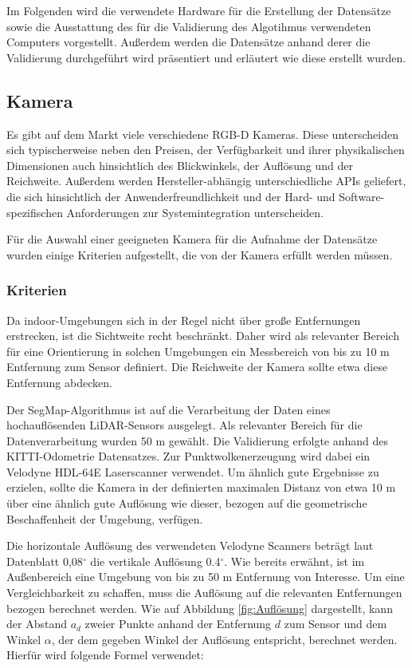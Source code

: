 Im Folgenden wird die verwendete Hardware für die Erstellung der Datensätze sowie die Ausstattung des für die Validierung des Algotihmus verwendeten Computers vorgestellt. Außerdem werden die Datensätze anhand derer die Validierung durchgeführt wird präsentiert und erläutert wie diese erstellt wurden.

\subsection[Kamera (Kopp)]{Kamera}
\label{sec:kamera}

Es gibt auf dem Markt viele verschiedene RGB-D Kameras. Diese unterscheiden sich typischerweise neben den Preisen, der Verfügbarkeit und ihrer physikalischen Dimensionen auch hinsichtlich des Blickwinkels, der Auflösung und der Reichweite. Außerdem werden Hersteller-abhängig unterschiedliche APIs geliefert, die sich hinsichtlich der Anwenderfreundlichkeit und der Hard- und Software-spezifischen Anforderungen zur Systemintegration unterscheiden. 

Für die Auswahl einer geeigneten Kamera für die Aufnahme der Datensätze wurden einige Kriterien aufgestellt, die von der Kamera erfüllt werden müssen. 

\subsubsection{Kriterien}

Da indoor-Umgebungen sich in der Regel nicht über große Entfernungen erstrecken, ist die Sichtweite recht beschränkt. Daher wird als relevanter Bereich für eine Orientierung in solchen Umgebungen ein Messbereich von bis zu 10 m Entfernung zum Sensor definiert. Die Reichweite der Kamera sollte etwa diese Entfernung abdecken. 

Der SegMap-Algorithmus ist auf die Verarbeitung der Daten eines hochauflösenden LiDAR-Sensors ausgelegt. Als relevanter Bereich für die Datenverarbeitung wurden 50 m gewählt. Die Validierung erfolgte anhand des KITTI-Odometrie Datensatzes. Zur Punktwolkenerzeugung wird dabei ein Velodyne HDL-64E Laserscanner verwendet. Um ähnlich gute Ergebnisse  zu erzielen, sollte die Kamera in der definierten maximalen Distanz von etwa 10 m über eine ähnlich gute Auflösung wie dieser, bezogen auf die geometrische Beschaffenheit der Umgebung, verfügen.

Die horizontale Auflösung des verwendeten Velodyne Scanners beträgt laut Datenblatt 0,08$^\circ$ die vertikale Auflösung 0.4$^\circ$. Wie bereits erwähnt, ist im Außenbereich eine Umgebung von bis zu 50 m Entfernung von Interesse. Um eine Vergleichbarkeit zu schaffen, muss die Auflösung auf die relevanten Entfernungen bezogen berechnet werden. Wie auf Abbildung \ref{fig:Auflösung} dargestellt, kann der Abstand $a_d$ zweier Punkte anhand der Entfernung $d$ zum Sensor und dem Winkel $\alpha$, der dem gegeben Winkel der Auflösung entspricht, berechnet werden. Hierfür wird folgende Formel verwendet:

